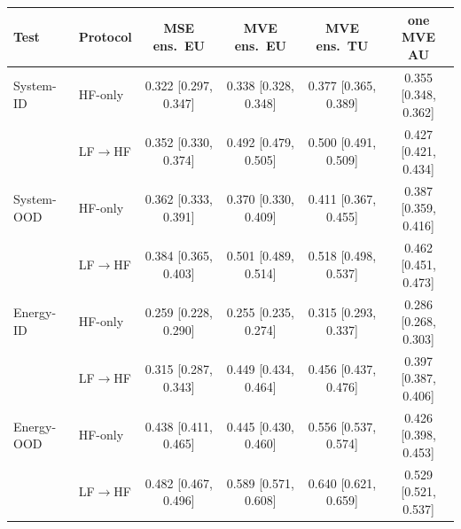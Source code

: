 \begin{tabular}{llcccc}
\toprule
Test & Protocol & MSE ens.\ EU & MVE ens.\ EU & MVE ens.\ TU & one MVE AU \\
\midrule
System-ID & HF-only & 0.322 {\scriptsize [0.297, 0.347]} & 0.338 {\scriptsize [0.328, 0.348]} & 0.377 {\scriptsize [0.365, 0.389]} & 0.355 {\scriptsize [0.348, 0.362]} \\
 & LF$\to$HF & 0.352 {\scriptsize [0.330, 0.374]} & 0.492 {\scriptsize [0.479, 0.505]} & 0.500 {\scriptsize [0.491, 0.509]} & 0.427 {\scriptsize [0.421, 0.434]} \\
\addlinespace
System-OOD & HF-only & 0.362 {\scriptsize [0.333, 0.391]} & 0.370 {\scriptsize [0.330, 0.409]} & 0.411 {\scriptsize [0.367, 0.455]} & 0.387 {\scriptsize [0.359, 0.416]} \\
 & LF$\to$HF & 0.384 {\scriptsize [0.365, 0.403]} & 0.501 {\scriptsize [0.489, 0.514]} & 0.518 {\scriptsize [0.498, 0.537]} & 0.462 {\scriptsize [0.451, 0.473]} \\
\addlinespace
Energy-ID & HF-only & 0.259 {\scriptsize [0.228, 0.290]} & 0.255 {\scriptsize [0.235, 0.274]} & 0.315 {\scriptsize [0.293, 0.337]} & 0.286 {\scriptsize [0.268, 0.303]} \\
 & LF$\to$HF & 0.315 {\scriptsize [0.287, 0.343]} & 0.449 {\scriptsize [0.434, 0.464]} & 0.456 {\scriptsize [0.437, 0.476]} & 0.397 {\scriptsize [0.387, 0.406]} \\
\addlinespace
Energy-OOD & HF-only & 0.438 {\scriptsize [0.411, 0.465]} & 0.445 {\scriptsize [0.430, 0.460]} & 0.556 {\scriptsize [0.537, 0.574]} & 0.426 {\scriptsize [0.398, 0.453]} \\
 & LF$\to$HF & 0.482 {\scriptsize [0.467, 0.496]} & 0.589 {\scriptsize [0.571, 0.608]} & 0.640 {\scriptsize [0.621, 0.659]} & 0.529 {\scriptsize [0.521, 0.537]} \\
\bottomrule
\end{tabular}
